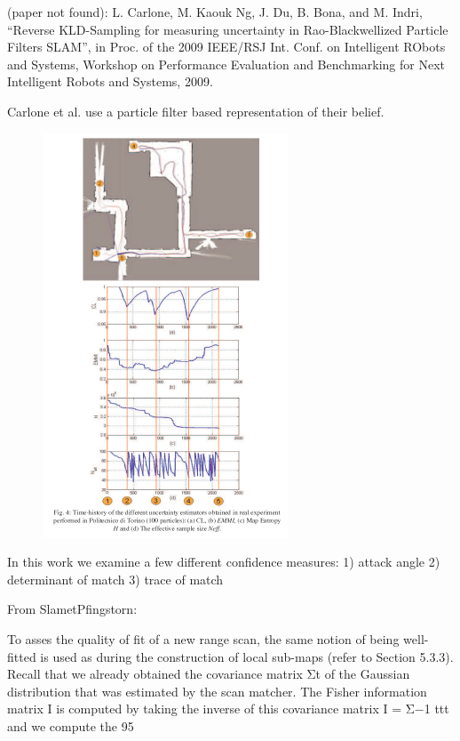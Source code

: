 (paper not found): L. Carlone, M. Kaouk Ng, J. Du, B. Bona, and M. Indri, “Reverse KLD-Sampling for measuring uncertainty in Rao-Blackwellized Particle Filters SLAM”, in Proc. of the 2009 IEEE/RSJ Int. Conf. on Intelligent RObots and Systems, Workshop on Performance Evaluation and Benchmarking for Next Intelligent Robots and Systems, 2009.

Carlone et al. use a particle filter based representation of their belief. 

\begin{figure}[ht]
  \begin{center}
    \includegraphics[scale=2]{images/poster_SIDRA2009_result.pdf}
  \end{center}
  \caption{}
  \label{fig:carlone}
\end{figure}

In this work we examine a few different confidence measures:
1) attack angle
2) determinant of match
3) trace of match

From SlametPfingstorn:

To asses the quality of fit
of a new range scan, the same notion of being well-fitted is used as during the construction
of local sub-maps (refer to Section 5.3.3). Recall that we already obtained the covariance
matrix Σt of the Gaussian distribution that was estimated by the scan matcher. The Fisher
information matrix I is computed by taking the inverse of this covariance matrix I = Σ−1 ttt
and we compute the 95%